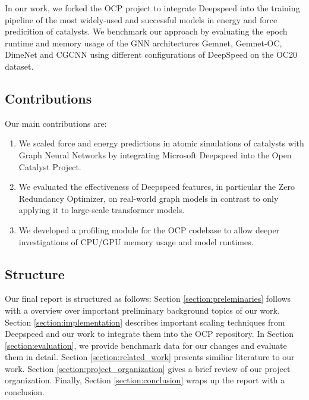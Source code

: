 In our work, we forked the OCP project to integrate Deepspeed into the training pipeline of the most widely-used 
and successful models in energy and force predicition of catalysts. 
We benchmark our approach by evaluating the epoch runtime and memory usage of the GNN architectures Gemnet, Gemnet-OC, 
DimeNet and CGCNN using different configurations of DeepSpeed on the OC20 dataset.


\subsection{Contributions}

Our main contributions are:

\begin{enumerate}
    \item We scaled force and energy predictions in atomic simulations of catalysts with Graph Neural Networks 
    by integrating Microsoft Deepspeed into the Open Catalyst Project.
    \item We evaluated the effectiveness of Deepspeed features, in particular the Zero Redundancy Optimizer, on 
    real-world graph models in contrast to only applying it to large-scale transformer models.
    \item We developed a profiling module for the OCP codebase to allow deeper investigations of CPU/GPU memory 
    usage and model runtimes.
\end{enumerate}

\subsection{Structure}

Our final report is structured as follows: Section \ref*{section:preleminaries} follows with a overview over 
important preliminary background topics of our work. Section \ref*{section:implementation} describes important 
scaling techniques from Deepspeed and our work to integrate them into the OCP repository. In Section 
\ref*{section:evaluation}, we provide benchmark data for our changes and evaluate them in detail. Section 
\ref*{section:related_work} presents similiar literature to our work. Section \ref*{section:project_organization} 
gives a brief review of our project organization. Finally, Section \ref*{section:conclusion} wraps up the 
report with a conclusion.